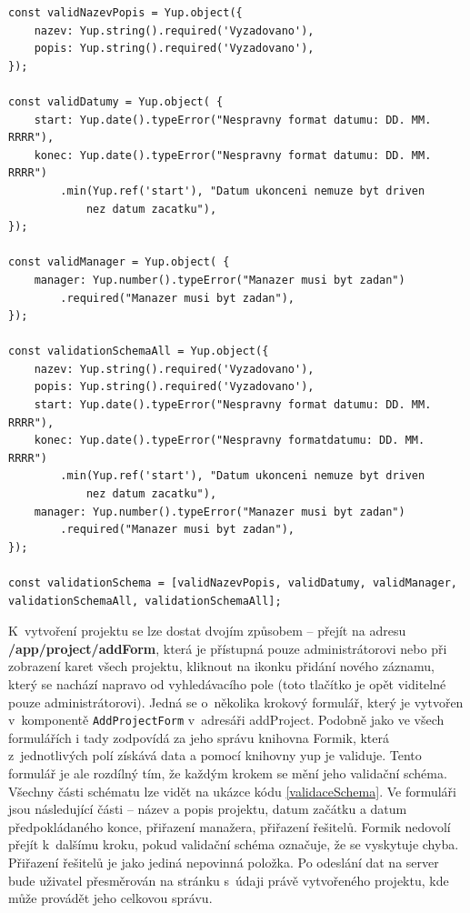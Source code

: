 \begin{lstlisting}[caption={Části validačního schématu formuláře pro tvorbu projektu},captionpos=b,frame=single,label=validaceSchema]
const validNazevPopis = Yup.object({
    nazev: Yup.string().required('Vyzadovano'),
    popis: Yup.string().required('Vyzadovano'),
});

const validDatumy = Yup.object( {
    start: Yup.date().typeError("Nespravny format datumu: DD. MM. RRRR"),
    konec: Yup.date().typeError("Nespravny format datumu: DD. MM. RRRR")
        .min(Yup.ref('start'), "Datum ukonceni nemuze byt driven 
            nez datum zacatku"),
});

const validManager = Yup.object( {
    manager: Yup.number().typeError("Manazer musi byt zadan")
        .required("Manazer musi byt zadan"),
});

const validationSchemaAll = Yup.object({
    nazev: Yup.string().required('Vyzadovano'),
    popis: Yup.string().required('Vyzadovano'),
    start: Yup.date().typeError("Nespravny format datumu: DD. MM. RRRR"),
    konec: Yup.date().typeError("Nespravny formatdatumu: DD. MM. RRRR")
        .min(Yup.ref('start'), "Datum ukonceni nemuze byt driven 
            nez datum zacatku"),
    manager: Yup.number().typeError("Manazer musi byt zadan")
        .required("Manazer musi byt zadan"),
});

const validationSchema = [validNazevPopis, validDatumy, validManager, 
validationSchemaAll, validationSchemaAll];
\end{lstlisting}

K~vytvoření projektu se lze dostat dvojím způsobem – přejít na adresu \textbf{/app/project/addForm}, která je přístupná pouze administrátorovi nebo při zobrazení karet všech projektu, kliknout na ikonku přidání nového záznamu, který se nachází napravo od vyhledávacího pole (toto tlačítko je opět viditelné pouze administrátorovi).  Jedná se o~několika krokový formulář, který je vytvořen v~komponentě \texttt{AddProjectForm} v~adresáři addProject. Podobně jako ve všech formulářích i tady zodpovídá za jeho správu knihovna Formik, která z~jednotlivých polí získává data a pomocí knihovny yup je validuje. Tento formulář je ale rozdílný tím, že každým krokem se mění jeho validační schéma. Všechny části schématu lze vidět na ukázce kódu \ref{validaceSchema}. Ve formuláři jsou následující části – název a popis projektu, datum začátku a datum předpokládaného konce, přiřazení manažera, přiřazení řešitelů. Formik nedovolí přejít k~dalšímu kroku, pokud validační schéma označuje, že se vyskytuje chyba. Přiřazení řešitelů je jako jediná nepovinná položka. Po odeslání dat na server bude uživatel přesměrován na stránku s~údaji právě vytvořeného projektu, kde může provádět jeho celkovou správu.

